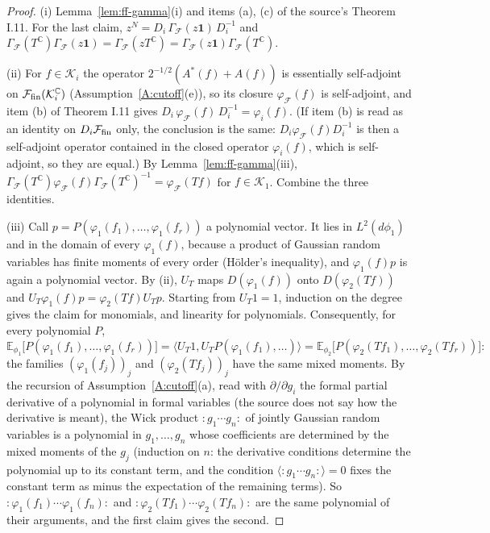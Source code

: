 \documentclass[11pt,a4paper]{article}
\theoremstyle{plain}
\theoremstyle{definition}
\theoremstyle{plain}
\theoremstyle{definition}
\newcommand{\C}{\mathbb{C}}
\newcommand{\E}{\mathbb{E}}
\newcommand{\ip}[2]{\langle #1,#2\rangle}
\begin{document}
\begin{proof}
(i) Lemma~\ref{lem:ff-gamma}(i) and items (a), (c) of the source's Theorem I.11.  For the last
claim, $z^N=D_i\,\Gamma_{\!\mathcal F}(z\mathbf 1)\,D_i^{-1}$ and
$\Gamma_{\!\mathcal F}(T^{\C})\Gamma_{\!\mathcal F}(z\mathbf 1)=\Gamma_{\!\mathcal F}(zT^{\C})=
\Gamma_{\!\mathcal F}(z\mathbf 1)\Gamma_{\!\mathcal F}(T^{\C})$.

(ii) For $f\in\mathcal K_i$ the operator $2^{-1/2}(A^*(f)+A(f))$ is essentially self-adjoint
on $\mathcal F_{\rm fin}(\mathcal K_i^{\C})$ (Assumption~\ref{A:cutoff}(e)), so its closure
$\varphi_{\mathcal F}(f)$ is self-adjoint, and item (b) of Theorem I.11 gives
$D_i\,\varphi_{\mathcal F}(f)\,D_i^{-1}=\varphi_i(f)$.  (If item (b) is read as an identity on
$D_i\mathcal F_{\rm fin}$ only, the conclusion is the same: $D_i\varphi_{\mathcal F}(f)D_i^{-1}$
is then a self-adjoint operator contained in the closed operator $\varphi_i(f)$, which is
self-adjoint, so they are equal.)  By Lemma~\ref{lem:ff-gamma}(iii),
$\Gamma_{\!\mathcal F}(T^{\C})\varphi_{\mathcal F}(f)\Gamma_{\!\mathcal F}(T^{\C})^{-1}=
\varphi_{\mathcal F}(Tf)$ for $f\in\mathcal K_1$.  Combine the three identities.

(iii) Call $p=P(\varphi_1(f_1),\dots,\varphi_1(f_r))$ a polynomial vector.  It lies in
$L^2(d\phi_1)$ and in the domain of every $\varphi_1(f)$, because a product of Gaussian random
variables has finite moments of every order (H\"older's inequality), and $\varphi_1(f)p$ is again a
polynomial vector.  By (ii), $U_T$ maps $D(\varphi_1(f))$ onto $D(\varphi_2(Tf))$ and
$U_T\varphi_1(f)p=\varphi_2(Tf)U_Tp$.  Starting from $U_T1=1$, induction on the degree gives the
claim for monomials, and linearity for polynomials.  Consequently, for every polynomial $P$,
\[
 \E_{\phi_1}\bigl[P(\varphi_1(f_1),\dots,\varphi_1(f_r))\bigr]
 =\ip{U_T1}{U_TP(\varphi_1(f_1),\dots)}
 =\E_{\phi_2}\bigl[P(\varphi_2(Tf_1),\dots,\varphi_2(Tf_r))\bigr] :
\]
the families $(\varphi_1(f_j))_j$ and $(\varphi_2(Tf_j))_j$ have the same mixed moments.  By the
recursion of Assumption~\ref{A:cutoff}(a), read with $\partial/\partial g_i$ the formal partial
derivative of a polynomial in formal variables (the source does not say how the derivative
is meant), the Wick product ${:}g_1\cdots
g_n{:}$ of jointly Gaussian random variables is a polynomial in $g_1,\dots,g_n$ whose
coefficients are determined by the mixed moments of the $g_j$ (induction on $n$: the
derivative conditions determine the polynomial up to its constant term, and the condition
$\langle{:}g_1\cdots g_n{:}\rangle=0$ fixes the constant term as minus the expectation of the
remaining terms).  So
${:}\varphi_1(f_1)\cdots\varphi_1(f_n){:}$ and ${:}\varphi_2(Tf_1)\cdots\varphi_2(Tf_n){:}$ are
the same polynomial of their arguments, and the first claim gives the second.


\end{proof}
\end{document}
